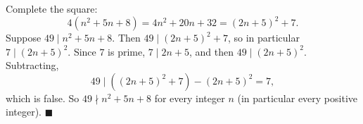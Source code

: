 Complete the square:
\[4\left(n^2+5n+8\right)=4n^2+20n+32=(2n+5)^2+7.\]
Suppose $49\mid n^2+5n+8$. Then $49\mid(2n+5)^2+7$, so in particular $7\mid(2n+5)^2$. Since $7$ is prime, $7\mid2n+5$, and then $49\mid(2n+5)^2$. Subtracting,
\[49\mid\left((2n+5)^2+7\right)-(2n+5)^2=7,\]
which is false. So $49\nmid n^2+5n+8$ for every integer $n$ (in particular every positive integer). $\blacksquare$
